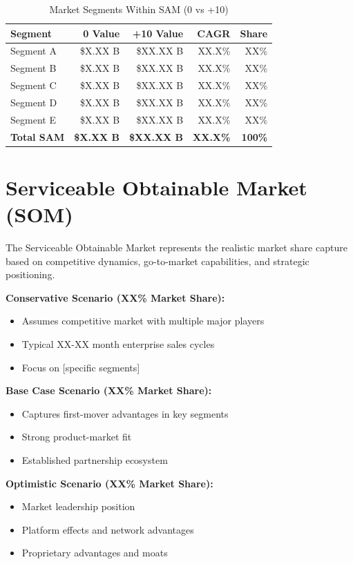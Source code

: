 \documentclass[11pt,letterpaper]{report}
\newcommand{\baseyear}{0}
\newcommand{\horizonyear}{\the\numexpr\baseyear+10\relax}    %
\begin{document}
\begin{table}[htbp]
\centering
\caption{Market Segments Within SAM (\baseyear{} vs \horizonyear{})}
\begin{tabular}{@{}lrrrr@{}}
\toprule
\textbf{Segment} & \textbf{\baseyear{} Value} & \textbf{\horizonyear{} Value} & \textbf{CAGR} & \textbf{Share} \\
\midrule
Segment A & \$X.XX B & \$XX.XX B & XX.X\% & XX\% \\
\rowcolor{tablealt} Segment B & \$X.XX B & \$XX.XX B & XX.X\% & XX\% \\
Segment C & \$X.XX B & \$XX.XX B & XX.X\% & XX\% \\
\rowcolor{tablealt} Segment D & \$X.XX B & \$XX.XX B & XX.X\% & XX\% \\
Segment E & \$X.XX B & \$XX.XX B & XX.X\% & XX\% \\
\midrule
\textbf{Total SAM} & \textbf{\$X.XX B} & \textbf{\$XX.XX B} & \textbf{XX.X\%} & \textbf{100\%} \\
\bottomrule
\end{tabular}
\label{tab:sam_segments}
\end{table}

\section{Serviceable Obtainable Market (SOM)}

The Serviceable Obtainable Market represents the realistic market share capture based on competitive dynamics, go-to-market capabilities, and strategic positioning.

\begin{keyinsightbox}[SOM Projections (\horizonyear{})]
\textbf{Conservative Scenario (XX\% Market Share):} 
\begin{itemize}
    \item Assumes competitive market with multiple major players
    \item Typical XX-XX month enterprise sales cycles
    \item Focus on [specific segments]
\end{itemize}

\textbf{Base Case Scenario (XX\% Market Share):} 
\begin{itemize}
    \item Captures first-mover advantages in key segments
    \item Strong product-market fit
    \item Established partnership ecosystem
\end{itemize}

\textbf{Optimistic Scenario (XX\% Market Share):} 
\begin{itemize}
    \item Market leadership position
    \item Platform effects and network advantages
    \item Proprietary advantages and moats
\end{itemize}
\end{keyinsightbox}
\end{document}
